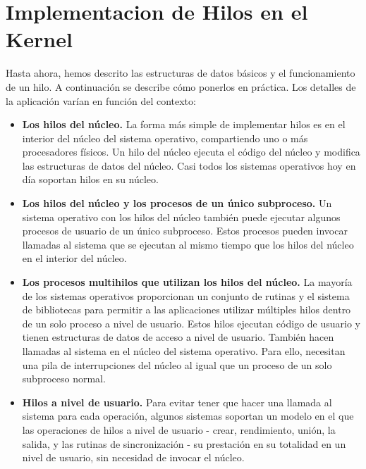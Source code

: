 \documentclass[10pt]{book}
\begin{document}
\section{Implementacion de Hilos en el Kernel}
Hasta ahora, hemos descrito las estructuras de datos básicos y el funcionamiento de un hilo. A continuación se describe cómo ponerlos en práctica. Los detalles de la aplicación varían en función del contexto:
\begin{itemize}
\item \textbf{Los hilos del núcleo.} La forma más simple de implementar hilos es en el interior del núcleo del sistema operativo, compartiendo uno o más procesadores físicos. Un hilo del núcleo ejecuta el código del núcleo y modifica las estructuras de datos del núcleo. Casi todos los sistemas operativos hoy en día soportan hilos en su núcleo.

\item \textbf{Los hilos del núcleo y los procesos de un único subproceso.} Un sistema operativo con los hilos del núcleo también puede ejecutar algunos procesos de usuario de un único subproceso. Estos procesos pueden invocar llamadas al sistema que se ejecutan al mismo tiempo que los hilos del núcleo en el interior del núcleo.

\item \textbf{Los procesos multihilos que utilizan los hilos del núcleo.} La mayoría de los sistemas operativos proporcionan un conjunto de rutinas y el sistema de bibliotecas para permitir a las aplicaciones utilizar múltiples hilos dentro de un solo proceso a nivel de usuario. Estos hilos ejecutan código de usuario y tienen estructuras de datos de acceso a nivel de usuario. También hacen llamadas al sistema en el núcleo del sistema operativo. Para ello, necesitan una pila de interrupciones del núcleo al igual que un proceso de un solo subproceso normal.

\item \textbf{Hilos a nivel de usuario.} Para evitar tener que hacer una llamada al sistema para cada operación, algunos sistemas soportan un modelo en el que las operaciones de hilos a nivel de usuario - crear, rendimiento, unión, la salida, y las rutinas de sincronización - su prestación en su totalidad en un nivel de usuario, sin necesidad de invocar el núcleo.
\end{itemize}
\end{document}
